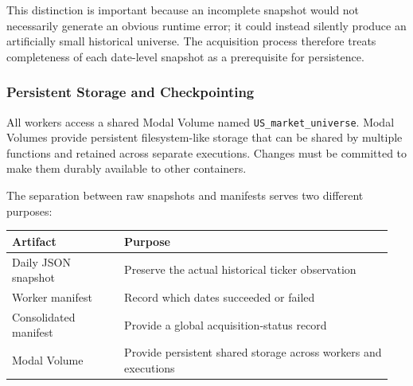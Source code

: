 \medskip

This distinction is important because an incomplete snapshot would not necessarily generate an obvious runtime error; it could instead silently produce an artificially small historical universe. The acquisition process therefore treats completeness of each date-level snapshot as a prerequisite for persistence.

\subsubsection*{Persistent Storage and Checkpointing}
All workers access a shared Modal Volume named \texttt{US\_market\_universe}. Modal Volumes provide persistent filesystem-like storage that can be shared by multiple functions and retained across separate executions. Changes must be committed to make them durably available to other containers.

    {\small
    }

The separation between raw snapshots and manifests serves two different purposes:
\begin{center}
    \small
    \begin{tabular}{p{0.28\linewidth} p{0.67\linewidth}}
        \toprule
        \textbf{Artifact}     & \textbf{Purpose}                                                \\
        \midrule
        Daily JSON snapshot   & Preserve the actual historical ticker observation               \\
        Worker manifest       & Record which dates succeeded or failed                          \\
        Consolidated manifest & Provide a global acquisition-status record                      \\
        Modal Volume          & Provide persistent shared storage across workers and executions \\
        \bottomrule
    \end{tabular}
\end{center}

